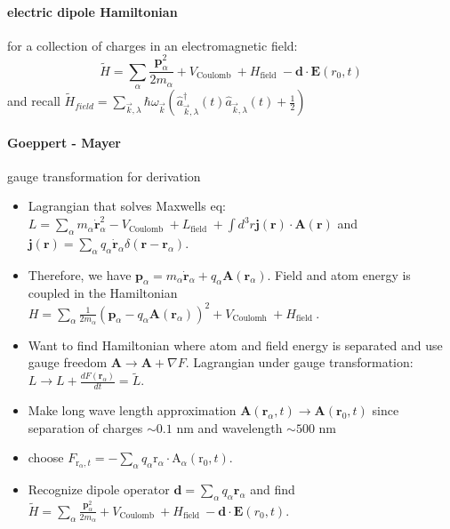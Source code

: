 \paragraph{electric dipole Hamiltonian} for a collection of charges in an electromagnetic field: 
$$\tilde{H}=\sum_\alpha \frac{\mathbf{p}_\alpha^2}{2 m_\alpha}+V_{\text {Coulomb }}+H_{\text {field }}-\mathbf{d} \cdot \mathbf{E}\left(r_0, t\right)$$
and recall $\tilde{H}_{field} = \sum_{\vec{k}, \lambda} \hbar \omega_{\vec{k}}\left(\hat{a}_{\vec{k}, \lambda}^{\dagger}(t) \hat{a}_{\vec{k}, \lambda}(t)+\frac{1}{2}\right)$\\

\paragraph{Goeppert - Mayer} gauge transformation for derivation
\begin{itemize}
  \item Lagrangian that solves Maxwells eq:\\ $L=\sum_\alpha m_\alpha \dot{\mathbf{r}}_\alpha^2-V_{\text {Coulomb }}+L_{\text {field }}+\int d^3 r \mathbf{j}(\mathbf{r}) \cdot \mathbf{A}(\mathbf{r})$
  and  $\mathbf{j}(\mathbf{r})=\sum_\alpha q_\alpha \dot{\mathbf{r}}_\alpha \delta\left(\mathbf{r}-\mathbf{r}_\alpha\right)$.
  \item Therefore, we have
  $\mathbf{p}_\alpha=m_\alpha \dot{\mathbf{r}}_\alpha+q_\alpha \mathbf{A}\left(\mathbf{r}_\alpha\right)$. Field and atom energy is coupled in 
  the Hamiltonian $H=\sum_\alpha \frac{1}{2 m_\alpha}\left(\mathbf{p}_\alpha-q_\alpha \mathbf{A}\left(\mathbf{r}_\alpha\right)\right)^2+V_{\text {Coulomh }}+H_{\text {field }}$.
  \item  Want to find Hamiltonian where atom and field energy is separated and use gauge freedom $\mathbf{A} \rightarrow \mathbf{A} + \nabla F$. Lagrangian under 
  gauge transformation: $L \rightarrow L+\frac{d F\left(\mathbf{r}_\alpha\right)}{d t}=\tilde{L}$.
  \item Make long wave length approximation $\mathbf{A}\left(\mathbf{r}_\alpha, t\right) \rightarrow \mathbf{A}\left(\mathbf{r}_0, t\right)$ since separation of charges $\sim 0.1$ nm and 
  wavelength $\sim 500$ nm 
  \item choose $F_{\mathrm{r}_\alpha, t}=-\sum_\alpha q_\alpha \mathrm{r}_\alpha \cdot \mathrm{A}_\alpha\left(\mathrm{r}_0, t\right)$.
  \item Recognize dipole operator $\mathbf{d}=\sum_\alpha q_\alpha \mathbf{r}_\alpha$ and find $\tilde{H}=\sum_\alpha \frac{\mathbf{p}_\alpha^2}{2 m_\alpha}+V_{\text {Coulomb }}+H_{\text {field }}-\mathbf{d} \cdot \mathbf{E}\left(r_0, t\right)$.
\end{itemize}


